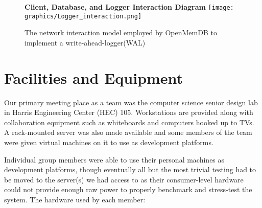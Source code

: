 \documentclass[letterpaper, 11pt]{article}
\begin{document}
  \begin{figure}[H]
    \centering
    \textbf{Client, Database, and Logger Interaction Diagram}
    \texttt{[image: graphics/Logger\_interaction.png]}
    \caption{The network interaction model employed by OpenMemDB to implement a
	     write-ahead-logger(WAL)}
    \label{fig:logger_interaction}
  \end{figure}

\newpage

\section{Facilities and Equipment}
Our primary meeting place as a team was the computer science senior design lab in Harris Engineering
Center (HEC) 105. Workstations are provided along with collaboration equipment such as
whiteboards and computers hooked up to TVs. A rack-mounted server was also made available and
some members of the team were given virtual machines on it to use as development
platforms.
\par\vspace{\baselineskip}
Individual group members were able to use their personal machines as development platforms, though
eventually all but the most trivial testing had to be moved to the server(s) we had access to
as their consumer-level hardware could not provide enough raw power to properly benchmark and
stress-test the system. The hardware used by each member:
\end{document}
